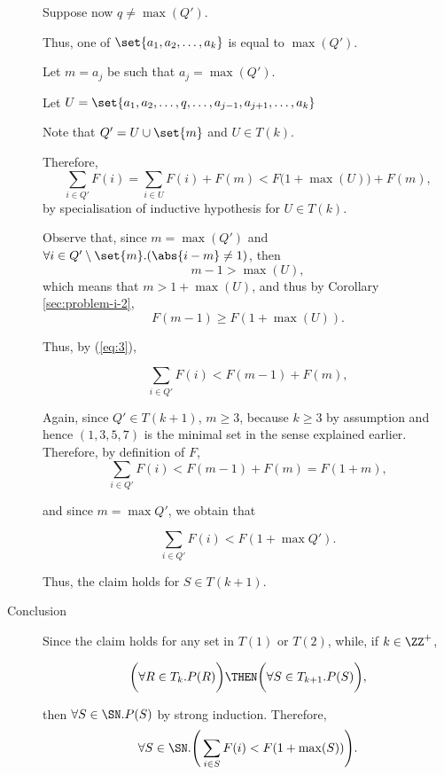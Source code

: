 \documentclass[11pt, letterpaper]{scrartcl}
\begin{document}
\begin{soln}
\begin{description}
    Suppose now $q \neq \max(Q')$.

    Thus, one of $\set{a_1, a_2, \dots, a_{k}}$ is equal to
    $\max(Q')$.

    Let $m=a_{j}$ be such that $a_j = \max(Q')$.

    Let $U = \set{a_1, a_2, \dots, q, \dots, a_{j-1}, a_{j+1}, \dots,
        a_k}$

      Note that $Q' = U\cup\set{m}$ and $U\in T(k)$.

      Therefore,
    \begin{equation}
      \label{eq:3}
      \sum_{i\in Q'} F(i) = \sum_{i\in U}F(i) + F(m) < F\big(1+\max(U)\big)+F(m),
    \end{equation}
    by specialisation of inductive hypothesis for $U\in T(k)$.
    
    Observe that, since $m = \max(Q')$ and
    $\forall i \in Q'\setminus\set{m}.(\abs{i-m}\neq 1)$, then
    \[m-1 > \max(U),\] which means that $m > 1+ \max(U)$, and thus by
    Corollary \ref{sec:problem-i-2}, \[F(m-1) \geq F(1+\max(U)).\]

    Thus, by (\ref{eq:3}),
    
    \begin{equation}
      \sum_{i\in Q'} F(i) < F(m-1)+F(m),
    \end{equation}

    Again, since $Q'\in T(k+1)$, $m\geq 3$, because $k\geq 3$ by assumption and hence $(1, 3, 5, 7)$ is the minimal set in the sense explained earlier. Therefore, by definition of $F$, 
    \begin{equation}
      \sum_{i\in Q'} F(i) < F(m-1)+F(m) = F(1+m) ,
    \end{equation}

    and since $m = \max Q'$, we obtain that

        \begin{equation}
      \sum_{i\in Q'} F(i) < F(1+\max Q').
    \end{equation}

    Thus, the claim holds for $S\in T(k+1)$.
  \item[Conclusion] \hfill

    Since the claim holds for any set in $T(1)$ or $T(2)$, while, if $k\in\ZZ^{+}$,

    \[\bigg(\forall R\in T_k.P(R)\bigg) \THEN \bigg(\forall S\in T_{k+1}.P(S)\bigg),\]

    then $\forall S\in \SN. P(S)$ by strong induction. Therefore,
    \begin{equation}
      \label{eq:4}
      \forall S\in\SN.\Bigg(\sum_{i\in S} F(i) < F(1+\max(S))\Bigg).
    \end{equation}
  \end{description}
\end{soln}
\end{document}
